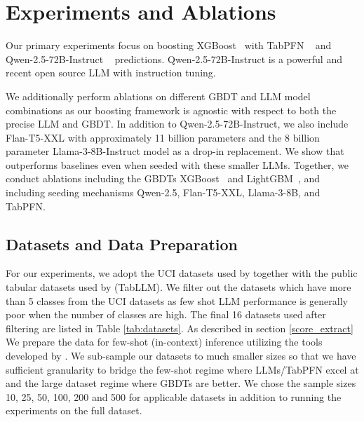 \section{Experiments and Ablations}
\label{experiments}

Our primary experiments focus on boosting XGBoost~\citep{chen2016xgboost} with TabPFN ~\citep{hollmann2023tabpfn} and Qwen-2.5-72B-Instruct ~\citep{qwen2.5} predictions. Qwen-2.5-72B-Instruct is a powerful and recent open source LLM with instruction tuning.

We additionally perform ablations on different GBDT and LLM model combinations as our boosting framework is agnostic with respect to both the precise LLM and GBDT.  In addition to Qwen-2.5-72B-Instruct, we also include Flan-T5-XXL \citep{flant5} with approximately 11 billion parameters and the 8 billion parameter Llama-3-8B-Instruct \citep{llama3modelcard} model as a drop-in replacement. We show that \methodname outperforms baselines even when seeded with these smaller LLMs.
Together, we conduct ablations including the GBDTs XGBoost~\citep{chen2016xgboost} and LightGBM~\citep{ke2017lightgbm}, and including seeding mechanisms Qwen-2.5, Flan-T5-XXL, Llama-3-8B, and TabPFN.

\subsection{Datasets and Data Preparation}

For our experiments, we adopt the UCI \citep{Dua:2019} datasets used by \citet{tabletSlack23} together with the public tabular datasets used by \citet{hegselmann2023tabllm} (TabLLM). We filter out the datasets which have more than 5 classes from the UCI datasets as few shot LLM performance is generally poor when the number of classes are high. The final 16 datasets used after filtering are listed in Table \ref{tab:datasets}. As described in section \ref{score_extract} We prepare the data for few-shot (in-context) inference utilizing the tools developed by \citet{tabletSlack23}. We sub-sample our datasets to much smaller sizes so that we have sufficient granularity to bridge the few-shot regime where LLMs/TabPFN excel at and the large dataset regime where GBDTs are better. We chose the sample sizes 10, 25, 50, 100, 200 and 500 for applicable datasets in addition to running the experiments on the full dataset.

